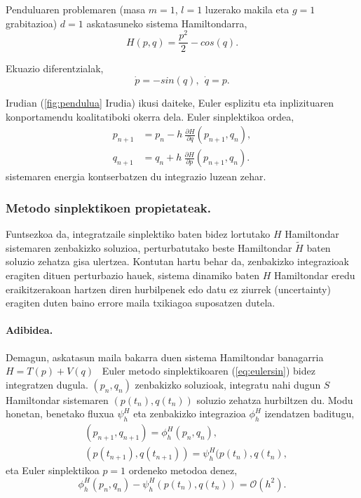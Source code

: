 Penduluaren problemaren (masa $m=1$, $l=1$ luzerako makila eta $g=1$ grabitazioa) $d=1$ askatasuneko sistema Hamiltondarra,
\begin{equation*}
H(p,q)= \frac{p^2}{2}- cos (q).
\end{equation*}

Ekuazio diferentzialak,
\begin{equation}
\label{eq:pendulua}
\dot{p}= -sin (q), \ \ \dot{q}=p.
\end{equation}

Irudian (\ref{fig:pendulua} Irudia) ikusi daiteke, Euler esplizitu eta inplizituaren konportamendu koalitatiboki okerra dela. Euler sinplektikoa ordea, 
\begin{align}
\label{eq:eulersin}
p_{n+1} & =p_n-h \ \frac{\partial H }{\partial q} (p_{n+1},q_{n}), \\
q_{n+1} & =q_n+h \ \frac{\partial H}{\partial p} (p_{n+1},q_{n}).
\end{align}
sistemaren energia kontserbatzen du integrazio luzean zehar.


\subsubsection*{Metodo sinplektikoen propietateak.}

Funtsezkoa da, integratzaile sinplektiko baten bidez lortutako $H$ Hamiltondar sistemaren zenbakizko soluzioa, perturbatutako beste Hamiltondar $\widetilde{H}$ baten soluzio zehatza gisa ulertzea. Kontutan hartu behar da, zenbakizko integrazioak eragiten dituen perturbazio hauek, sistema dinamiko baten $H$ Hamiltondar eredu eraikitzerakoan hartzen  diren hurbilpenek edo datu ez ziurrek (uncertainty) eragiten duten baino errore maila txikiagoa suposatzen dutela.    
 

\paragraph{Adibidea.}
Demagun, askatasun maila bakarra duen sistema Hamiltondar banagarria $H=T(p)+V(q)$ ~Euler metodo sinplektikoaren (\ref{eq:eulersin}) bidez integratzen dugula.  $(p_n,q_n)$ zenbakizko soluzioak, integratu nahi dugun $S$ Hamiltondar sistemaren $(p(t_n),q(t_n))$ soluzio zehatza hurbiltzen du.  Modu honetan, benetako fluxua $\psi_h^H$ eta zenbakizko integrazioa $\phi_h^H$ izendatzen baditugu,
\begin{align*}
&(p_{n+1},q_{n+1}) =\phi_h^H(p_n,q_n), \\
&(p(t_{n+1}),q(t_{n+1})) =\psi_h^H(p(t_n),q(t_n), 
\end{align*} 
eta Euler sinplektikoa $p=1$ ordeneko metodoa denez,
\begin{equation*}
\phi_h^H(p_n,q_n)-\psi_h^H(p(t_n),q(t_n))= \mathcal{O}(h^2).
\end{equation*}    

